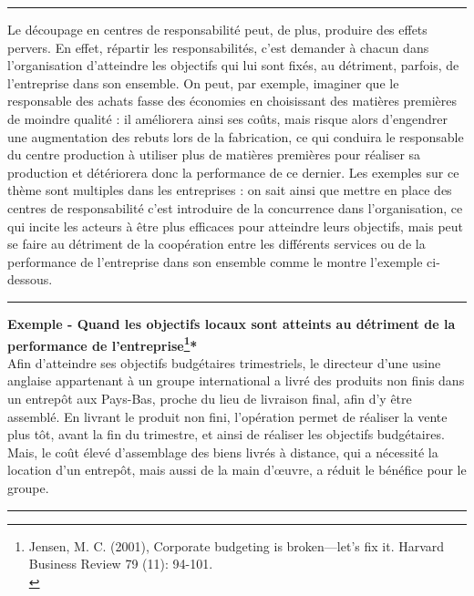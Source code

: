 \documentclass{tufte-handout}
\begin{document}
\begin{enumerate}
\noindent\rule{\textwidth}{0.5pt}

Le découpage en centres de responsabilité peut, de plus, produire des effets pervers. En effet, répartir les responsabilités, c’est demander à chacun dans l’organisation d’atteindre les objectifs qui lui sont fixés, au détriment, parfois, de l’entreprise dans son ensemble. On peut, par exemple, imaginer que le responsable des achats fasse des économies en choisissant des matières premières de moindre qualité : il améliorera ainsi ses coûts, mais risque alors d’engendrer une augmentation des rebuts lors de la fabrication, ce qui conduira le responsable du centre production à utiliser plus de matières premières pour réaliser sa production et détériorera donc la performance de ce dernier. Les exemples sur ce thème sont multiples dans les entreprises : on sait ainsi que mettre en place des centres de responsabilité c’est introduire de la concurrence dans l’organisation, ce qui incite les acteurs à être plus efficaces pour atteindre leurs objectifs, mais peut se faire au détriment de la coopération entre les différents services ou de la performance de l’entreprise dans son ensemble comme le montre l’exemple ci-dessous.\\

\noindent\rule{\textwidth}{0.5pt}
\textbf{Exemple - Quand les objectifs locaux sont atteints au détriment de la performance de l’entreprise\footnote{Jensen, M. C. (2001), Corporate budgeting is broken—let's fix it. Harvard Business Review 79 (11): 94-101.\\}*}\\
Afin d’atteindre ses objectifs budgétaires trimestriels, le directeur d’une usine anglaise appartenant à un groupe international a livré des produits non finis dans un entrepôt aux Pays-Bas, proche du lieu de livraison final, afin d’y être assemblé. En livrant le produit non fini, l’opération permet de réaliser la vente plus tôt, avant la fin du trimestre, et ainsi de réaliser les objectifs budgétaires. Mais, le coût élevé d’assemblage des biens livrés à distance, qui a nécessité la location d’un entrepôt, mais aussi de la main d’œuvre, a réduit le bénéfice pour le groupe.\\

\noindent\rule{\textwidth}{0.5pt}


\end{enumerate}
\end{document}
